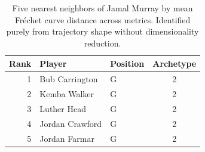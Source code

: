 \begin{table}[htbp]
  \centering\small
  \begin{tabular}{rllc}
    \toprule
    Rank & Player & Position & Archetype \\
    \midrule
    1 & Bub Carrington & G & 2 \\
    2 & Kemba Walker & G & 2 \\
    3 & Luther Head & G & 2 \\
    4 & Jordan Crawford & G & 2 \\
    5 & Jordan Farmar & G & 2 \\
    \bottomrule
  \end{tabular}
  \caption{Five nearest neighbors of Jamal Murray by mean Fr\'{e}chet curve distance across metrics. Identified purely from trajectory shape without dimensionality reduction.}
  \label{tab:Jamal_Murray_frechet_curve_neighbors}
\end{table}

